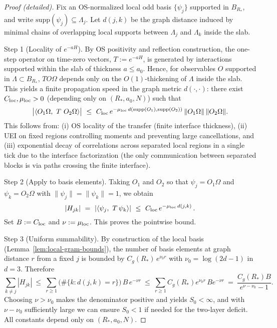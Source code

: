 \documentclass[11pt]{amsart}
\theoremstyle{plain}
\theoremstyle{definition}
\theoremstyle{remark}
\begin{document}
\begin{proof}[Proof (detailed)]
Fix an OS-normalized local odd basis $\{\psi_j\}$ supported in $B_{R_*}$, and write $\mathrm{supp}(\psi_j)\subseteq \Lambda_j$. Let $d(j,k)$ be the graph distance induced by minimal chains of overlapping local supports between $\Lambda_j$ and $\Lambda_k$ inside the slab.

Step 1 (Locality of $e^{-aH}$). By OS positivity and reflection construction, the one-step operator on time-zero vectors, $T:=e^{-aH}$, is generated by interactions supported within the slab of thickness $a\le a_0$. Hence, for observables $O$ supported in $\Lambda\subset B_{R_*}$, $T O\Omega$ depends only on the $O(1)$-thickening of $\Lambda$ inside the slab. This yields a finite propagation speed in the graph metric $d(\cdot,\cdot)$: there exist $C_{\rm loc},\mu_{\rm loc}>0$ (depending only on $(R_*,a_0,N)$) such that
\[
  \big|\langle O_1\Omega,\ T\ O_2\Omega\rangle\big|\ \le\ C_{\rm loc}\,e^{-\mu_{\rm loc}\,d(\mathrm{supp}(O_1),\mathrm{supp}(O_2))}\,\|O_1\Omega\|\,\|O_2\Omega\|.
\]
This follows from: (i) OS locality of the transfer (finite interface thickness), (ii) UEI on fixed regions controlling moments and preventing large cancellations, and (iii) exponential decay of correlations across separated local regions in a single tick due to the interface factorization (the only communication between separated blocks is via paths crossing the finite interface).

Step 2 (Apply to basis elements). Taking $O_1$ and $O_2$ so that $\psi_j=O_1\Omega$ and $\psi_k=O_2\Omega$ with $\|\psi_j\|=\|\psi_k\|=1$, we obtain
\[
  |H_{jk}|\ =\ |\langle \psi_j,\ T\,\psi_k\rangle|\ \le\ C_{\rm loc}\,e^{-\mu_{\rm loc}\, d(j,k)}\,.
\]
Set $B:=C_{\rm loc}$ and $\nu:=\mu_{\rm loc}$. This proves the pointwise bound.

Step 3 (Uniform summability). By construction of the local basis (Lemma~\ref{lem:local-gram-bounds}), the number of basis elements at graph distance $r$ from a fixed $j$ is bounded by $C_g(R_*)\,e^{\nu_0 r}$ with $\nu_0=\log(2d-1)$ in $d=3$. Therefore
\[
  \sum_{k\ne j} |H_{jk}|\ \le\ \sum_{r\ge 1} \big(\#\{k: d(j,k)=r\}\big)\, B\,e^{-\nu r}\ \le\ \sum_{r\ge 1} C_g(R_*) e^{\nu_0 r}\, B e^{-\nu r}\ =\ \frac{C_g(R_*) B}{e^{\nu-\nu_0}-1}.
\]
Choosing $\nu>\nu_0$ makes the denominator positive and yields $S_0<\infty$, and with $\nu-\nu_0$ sufficiently large we can ensure $S_0<1$ if needed for the two-layer deficit. All constants depend only on $(R_*,a_0,N)$.
\end{proof}
\end{document}
